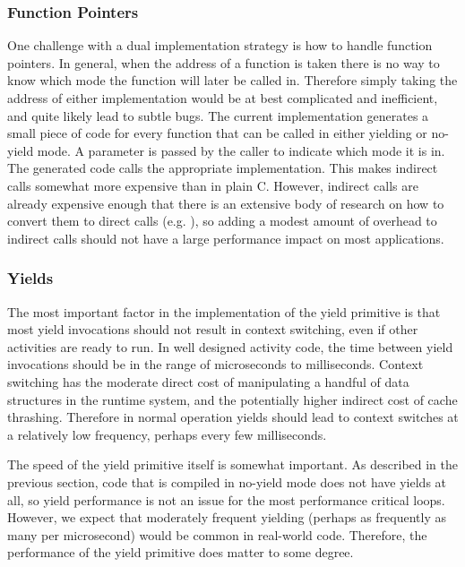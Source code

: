 \documentclass[9pt,preprint]{sigplanconf-2}
\begin{document}

\subsubsection{Function Pointers}

One challenge with a dual implementation strategy is how to handle function pointers.
In general, when the address of a function is taken there is no way to know which mode the function will later be called in.
Therefore simply taking the address of either implementation would be at best complicated and inefficient, and quite likely lead to subtle bugs.
The current implementation generates a small piece of code for every function that can be called in either yielding or no-yield mode.
A parameter is passed by the caller to indicate which mode it is in.
The generated code calls the appropriate implementation.
This makes indirect calls somewhat more expensive than in plain C.
However, indirect calls are already expensive enough that there is an extensive body of research on how to convert them to direct calls (e.g. \cite{Dean1995}), so adding a modest amount of overhead to indirect calls should not have a large performance impact on most applications.

\subsubsection{Yields}

The most important factor in the implementation of the yield primitive is that most yield invocations should not result in context switching, even if other activities are ready to run.
In well designed activity code, the time between yield invocations should be in the range of microseconds to milliseconds.
Context switching has the moderate direct cost of manipulating a handful of data structures in the runtime system, and the potentially higher indirect cost of cache thrashing.
Therefore in normal operation yields should lead to context switches at a relatively low frequency, perhaps every few milliseconds.

The speed of the yield primitive itself is somewhat important.
As described in the previous section, code that is compiled in no-yield mode does not have yields at all, so yield performance is not an issue for the most performance critical loops.
However, we expect that moderately frequent yielding (perhaps as frequently as many per microsecond) would be common in real-world code.
Therefore, the performance of the yield primitive does matter to some degree.
\end{document}
